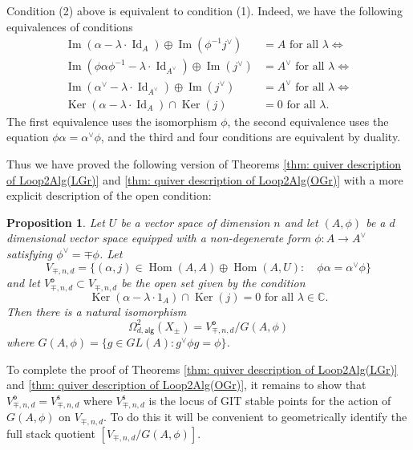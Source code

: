 \documentclass{amsart}
\newtheorem{proposition}[theorem]{Proposition}
\theoremstyle{definition}
\newcommand{\CC} {{\mathbb C}}          %
\newcommand{\Hom}{\operatorname{Hom}}
\newcommand{\Ker}{\operatorname{Ker}}
\newcommand{\im}{\operatorname{Im}}
\newcommand{\alg}{\mathsf{alg}}
\newcommand{\open}{\mathsf{o}}
\newcommand{\stable}{\mathsf{s}}
\newcommand{\LoopTwo}{\Omega^{2}_{d,\alg}}
\newcommand{\Id}{\operatorname{Id}}
\newcommand{\Xpm}{X_{\pm}}
\begin{document}
\bigskip

Condition (2) above is equivalent to condition (1). Indeed, we have
the following equivalences of conditions
\begin{align*}
\im (\alpha -\lambda \cdot \Id_{A})\oplus  \im (\phi^{-1}j^{\vee} )&=A
\text{ for all } \lambda \iff \\
\im (\phi \alpha\phi^{-1} -\lambda \cdot \Id_{A^{\vee }})\oplus  \im
(j^{\vee} )&=A^{\vee }
\text{ for all } \lambda \iff \\
\im (\alpha^{\vee } -\lambda \cdot \Id_{A^{\vee }})\oplus  \im
(j^{\vee} )&=A^{\vee }
\text{ for all } \lambda \iff \\
\Ker (\alpha -\lambda \cdot \Id_{A})\cap \Ker (j) &= 0 \text{ for all } \lambda .
\end{align*}
The first equivalence uses the isomorphism $\phi$, the second
equivalence uses the equation $\phi \alpha  = \alpha^{\vee}\phi$, and
the third and four conditions are equivalent by duality.

Thus we have proved the following version of Theorems \ref{thm: quiver
description of Loop2Alg(LGr)} and \ref{thm: quiver description of
Loop2Alg(OGr)} with a more explicit description of the open condition:
\begin{proposition}\label{prop: quiver description of Loop2Alg(Xpm)
with explicit open condition}
Let $U$ be a vector space of dimension $n$ and let $(A,\phi )$ be a
$d$ dimensional vector space equipped with a non-degenerate form $\phi
:A\to A^{\vee}$ satisfying $\phi^{\vee}=\mp \phi$. Let
\[
V_{\mp ,n,d} = \{(\alpha ,j)\in \Hom (A,A)\oplus \Hom (A,U):\quad \phi
\alpha =\alpha^{\vee}\phi \}
\]
and let $V^{\open}_{\mp ,n,d}\subset V_{\mp ,n,d}$ be the open set given
by the condition
\[
\Ker (\alpha -\lambda \cdot 1_{A})\cap \Ker (j) = 0\text{ for all } \lambda \in \CC .
\]
Then there is a natural isomorphism
\[
\LoopTwo (\Xpm ) = V^{\open}_{\mp ,n,d}/G(A,\phi )
\]
where $G(A,\phi ) = \{g\in GL(A): g^{\vee}\phi g = \phi \}$. 
\end{proposition}

To complete the proof of Theorems \ref{thm: quiver description of
Loop2Alg(LGr)} and \ref{thm: quiver description of Loop2Alg(OGr)}, it
remains to show that $V^{\open}_{\mp ,n,d} = V^{\stable }_{\mp ,n,d}$
where $V^{\stable }_{\mp ,n,d}$ is the locus of GIT stable points for
the action of $G(A,\phi )$ on $V_{\mp ,n,d}$. To do this it will be
convenient to geometrically identify the full stack quotient $[V_{\mp
,n,d} / G(A,\phi )]$.
\end{document}
